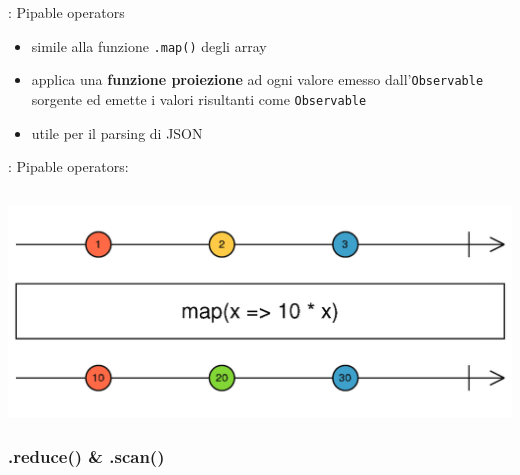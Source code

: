             \begin{frame}{\insertsubsectionhead}{: Pipable operators}
                \begin{block}{\texttt{\insertsubsubsectionhead}}
                    \begin{itemize}
                        \item
                            simile alla funzione \texttt{.map()} degli array
                        \item
                            applica una \textbf{funzione proiezione} ad ogni valore emesso dall'\texttt{Observable} sorgente ed emette i valori risultanti come \texttt{Observable}
                        \item
                            utile per il parsing di JSON
                    \end{itemize}
                \end{block}

            \end{frame}

            \begin{frame}[fragile]{\insertsubsectionhead}{: Pipable operators: \texttt{\insertsubsubsectionhead}}
                \inputminted{js}{src/map.js}
                \includegraphics[width=\linewidth]{map}
            \end{frame}

            \subsubsection{.reduce() \& .scan()}\label{subsub:reduce}

